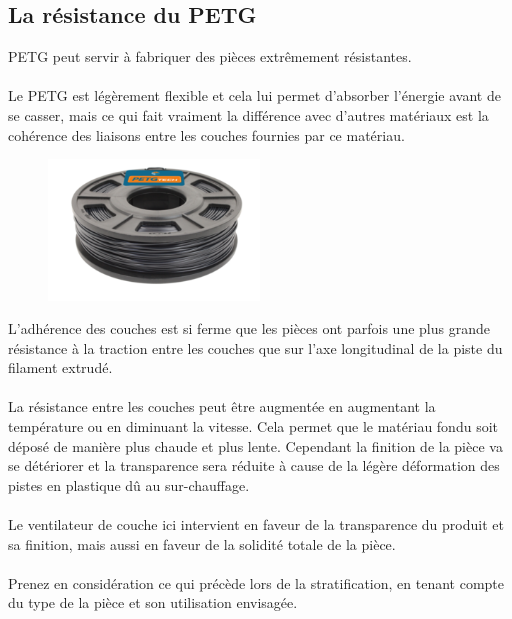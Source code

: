 \documentclass[11pt,a4paper]{article}
\begin{document}
	\subsection{La résistance du PETG}PETG peut servir à fabriquer des pièces extrêmement résistantes.
\\\\
Le PETG est légèrement flexible et cela lui permet d’absorber l’énergie avant de se casser, mais ce qui fait vraiment la différence avec d’autres matériaux est la cohérence des liaisons entre les couches fournies par ce matériau.
\begin{figure}[H]
\centering
\includegraphics[width=0.5\textwidth,cfbox=azul_marcos 1pt 0pt]{FOTOS/PETG250NEGRO}
\end{figure}
L’adhérence des couches est si ferme que les pièces ont parfois une plus grande résistance à la traction entre les couches que sur l’axe longitudinal de la piste du filament extrudé.
\\\\La résistance entre les couches peut être augmentée en augmentant la température ou en diminuant la vitesse. Cela permet que le matériau fondu soit déposé de manière plus chaude et plus lente. Cependant la finition de la pièce va se détériorer et la transparence sera réduite à cause de la légère déformation des pistes en plastique dû au sur-chauffage.
\\\\Le ventilateur de couche ici intervient en faveur de la transparence du produit et sa finition, mais aussi en faveur de la solidité totale de la pièce.
\\\\Prenez en considération ce qui précède lors de la stratification, en tenant compte du type de la pièce et son utilisation envisagée.
\end{document}
